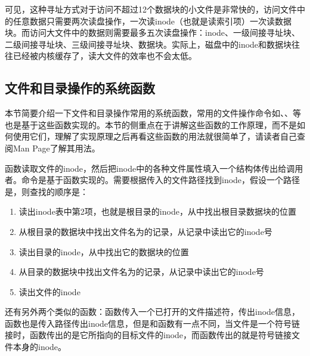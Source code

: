 可见，这种寻址方式对于访问不超过12个数据块的小文件是非常快的，访问文件中的任意数据只需要两次读盘操作，一次读inode（也就是读索引项）一次读数据块。而访问大文件中的数据则需要最多五次读盘操作：inode、一级间接寻址块、二级间接寻址块、三级间接寻址块、数据块。实际上，磁盘中的inode和数据块往往已经被内核缓存了，读大文件的效率也不会太低。


\subsection{文件和目录操作的系统函数}
%


本节简要介绍一下文件和目录操作常用的系统函数，常用的文件操作命令如、、等也是基于这些函数实现的。本节的侧重点在于讲解这些函数的工作原理，而不是如何使用它们，理解了实现原理之后再看这些函数的用法就很简单了，请读者自己查阅Man Page了解其用法。



函数读取文件的inode，然后把inode中的各种文件属性填入一个结构体传出给调用者。命令是基于函数实现的。需要根据传入的文件路径找到inode，假设一个路径是，则查找的顺序是：


\begin{enumerate}

\item 读出inode表中第2项，也就是根目录的inode，从中找出根目录数据块的位置

\item 从根目录的数据块中找出文件名为的记录，从记录中读出它的inode号

\item 读出目录的inode，从中找出它的数据块的位置

\item 从目录的数据块中找出文件名为的记录，从记录中读出它的inode号

\item 读出文件的inode
\end{enumerate}


还有另外两个类似的函数：函数传入一个已打开的文件描述符，传出inode信息，函数也是传入路径传出inode信息，但是和函数有一点不同，当文件是一个符号链接时，函数传出的是它所指向的目标文件的inode，而函数传出的就是符号链接文件本身的inode。




